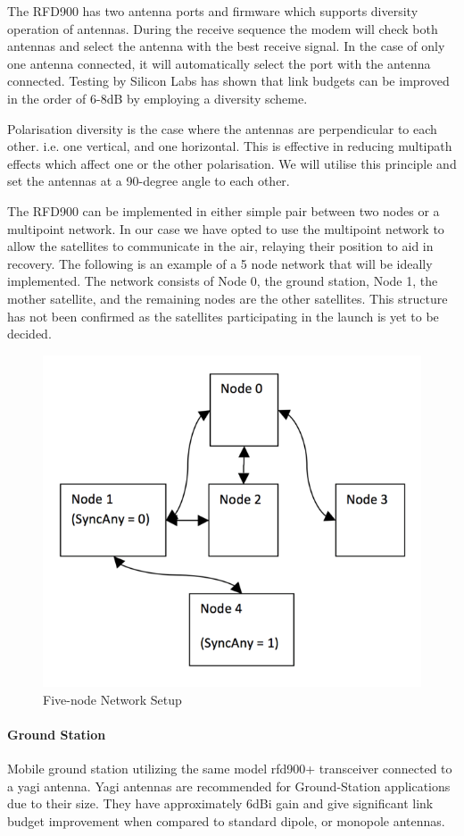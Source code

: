 \noindent
The RFD900 has two antenna ports and firmware which supports diversity operation of antennas. During the receive sequence the modem will check both antennas and select the antenna with the best receive signal. In the case of only one antenna connected, it will automatically select the port with the antenna connected. Testing by Silicon Labs has shown that link budgets can be improved in the order of 6-8dB by employing a diversity scheme.

\noindent 
Polarisation diversity is the case where the antennas are perpendicular to each other. i.e. one vertical, and one horizontal. This is effective in reducing multipath effects which affect one or the other polarisation. We will utilise this principle and set the antennas at a 90-degree angle to each other.

\noindent
The RFD900 can be implemented in either simple pair between two nodes or a multipoint network. In our case we have opted to use the multipoint network to allow the satellites to communicate in the air, relaying their position to aid in recovery. The following is an example of a 5 node network that will be ideally implemented. The network consists of Node 0, the ground station, Node 1, the mother satellite, and the remaining nodes are the other satellites. This structure has not been confirmed as the satellites participating in the launch is yet to be decided.
\begin{figure}[H]
    \centering
    \includegraphics[width=0.7\linewidth]{./figures/nodes}
    \caption{Five-node Network Setup}
\end{figure}

\paragraph{Ground Station}
Mobile ground station utilizing the same model rfd900+ transceiver connected to a yagi antenna. Yagi antennas are recommended for Ground-Station applications due to their size. They have approximately 6dBi gain and give significant link budget improvement when compared to standard dipole, or monopole antennas. 

